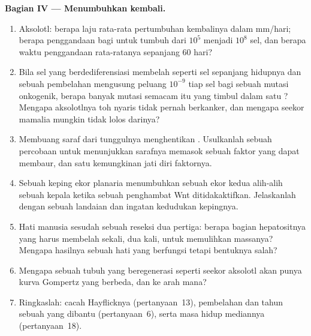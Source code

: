 \begin{problem}
\medskip
\noindent\textbf{Bagian IV --- Menumbuhkan kembali.}
\begin{enumerate}[resume]
  \item Aksolotl: berapa laju rata-rata pertumbuhan kembalinya dalam mm/hari; berapa penggandaan bagi
         untuk tumbuh dari $10^{5}$ menjadi $10^{8}$ sel, dan berapa waktu
        penggandaan rata-ratanya sepanjang 60 hari?
  \item Bila sel yang berdediferensiasi membelah seperti sel  sepanjang
        hidupnya dan sebuah pembelahan mengusung peluang $10^{-9}$ tiap sel bagi sebuah
        mutasi onkogenik, berapa banyak mutasi semacam itu yang timbul dalam satu
        ? Mengapa aksolotlnya toh nyaris tidak pernah
        berkanker, dan mengapa seekor mamalia mungkin tidak lolos darinya?
  \item Membuang saraf dari tunggulnya menghentikan . Usulkanlah sebuah percobaan
        untuk menunjukkan sarafnya memasok sebuah faktor yang dapat membaur, dan satu
        kemungkinan jati diri faktornya.
  \item Sebuah keping ekor planaria menumbuhkan sebuah ekor kedua alih-alih sebuah kepala
        ketika sebuah penghambat Wnt ditidakaktifkan. Jelaskanlah dengan sebuah landaian
        dan ingatan kedudukan kepingnya.
  \item Hati manusia sesudah sebuah reseksi dua pertiga: berapa bagian
        hepatositnya yang harus membelah sekali, dua kali, untuk memulihkan massanya?
        Mengapa hasilnya sebuah hati yang berfungsi tetapi bentuknya salah?
  \item Mengapa sebuah tubuh yang beregenerasi seperti seekor aksolotl akan punya
        kurva Gompertz yang berbeda, dan ke arah mana?
  \item Ringkaslah: cacah Hayflicknya (pertanyaan~13), pembelahan dan tahun sebuah
         yang dibantu  (pertanyaan~6), serta masa hidup
        mediannya (pertanyaan~18).
\end{enumerate}
\end{problem}
